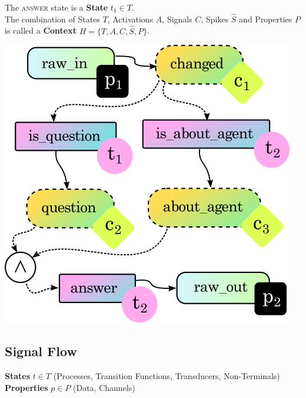 \documentclass{article}
\newenvironment{Figure}
  {\par\medskip\noindent\minipage{\linewidth}}
  {\endminipage\par\medskip}
\begin{document}
\begin{multicols}{2}
The \textsc{answer} state is a \textbf{State} $t_1 \in T$.  \\


The combination of States $T$, Activations $A$, Signals $C$, Spikes $\hat{S}$ and Properties $P$ is called a \textbf{Context} $H = \{T,A,C,\hat{S},P\}$.\\

\begin{Figure}
\centering
\includegraphics{figs/gra1.png}
\label{fig:gra1}
\end{Figure}

\subsection{Signal Flow}

\textbf{States} $t \in T$ (Processes, Transition Functions, Transducers, Non-Terminals)\\

\textbf{Properties} $p \in P$  (Data, Channels)\\


\end{multicols}
\end{document}

